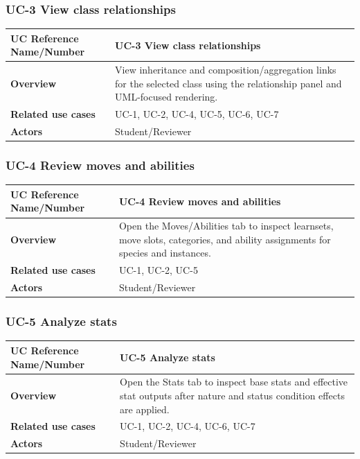 \documentclass[12pt]{article}
\begin{document}
\subsubsection*{UC-3 View class relationships}
\begin{tabular}{|p{}|p{}|}
\hline
\textbf{UC Reference Name/Number} & \textbf{UC-3 View class relationships} \\
\hline
\textbf{Overview} & View inheritance and composition/aggregation links for the
selected class using the relationship panel and UML-focused rendering. \\
\hline
\textbf{Related use cases} & UC-1, UC-2, UC-4, UC-5, UC-6, UC-7 \\
\hline
\textbf{Actors} & Student/Reviewer \\
\hline
\end{tabular}

\subsubsection*{UC-4 Review moves and abilities}
\begin{tabular}{|p{}|p{}|}
\hline
\textbf{UC Reference Name/Number} & \textbf{UC-4 Review moves and abilities} \\
\hline
\textbf{Overview} & Open the Moves/Abilities tab to inspect learnsets, move
slots, categories, and ability assignments for species and instances. \\
\hline
\textbf{Related use cases} & UC-1, UC-2, UC-5 \\
\hline
\textbf{Actors} & Student/Reviewer \\
\hline
\end{tabular}

\subsubsection*{UC-5 Analyze stats}
\begin{tabular}{|p{}|p{}|}
\hline
\textbf{UC Reference Name/Number} & \textbf{UC-5 Analyze stats} \\
\hline
\textbf{Overview} & Open the Stats tab to inspect base stats and effective
stat outputs after nature and status condition effects are applied. \\
\hline
\textbf{Related use cases} & UC-1, UC-2, UC-4, UC-6, UC-7 \\
\hline
\textbf{Actors} & Student/Reviewer \\
\hline
\end{tabular}
\end{document}
